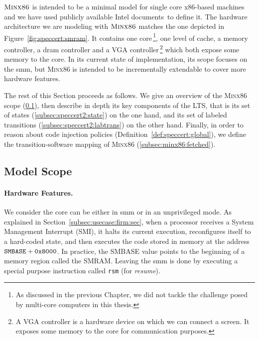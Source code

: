 $\textsc{Minx86}$ is intended to be a minimal model for single core x86-based
machines and we have used publicly available Intel
documents\,\cite{intel2013celeron,intel2009mch,intel2014manual} to define it.
%
The hardware architecture we are modeling with $\textsc{Minx86}$ matches the
one depicted in Figure~\ref{fig:speccert:smram}. It contains one
core\,\footnote{As discussed in the previous Chapter, we did not tackle the
  challenge posed by multi-core computers in this thesis.}, one level of cache, a
memory controller, a \ac{dram} controller and a VGA controller\,\footnote{A VGA
  controller is a hardware device on which we can connect a screen. It exposes
  some memory to the core for communication purposes.} which both expose some
memory to the core.
%
In its current state of implementation, its scope focuses on the \ac{smm}, but
{\scshape Minx86} is intended to be incrementally extendable to cover more
hardware features.

The rest of this Section proceeds as follows.
%
We give an overview of the {\scshape Minx86} scope (\ref{sec:speccert2:scope}),
then describe in depth its key components of the LTS, that is its set of states
(\ref{subsec:speccert2:state}) on the one hand, and its set of labeled
transitions (\ref{subsec:speccert2:labtrans}) on the other hand.
%
Finally, in order to reason about code injection policies
(Definition~\ref{def:speccert:global}), we define the transition-software
mapping of {\scshape Minx86} (\ref{subsec:minx86:fetched}).

\subsection{Model Scope}
\label{sec:speccert2:scope}

\paragraph{Hardware Features.}
%
We consider the core can be either in \ac{smm} or in an unprivileged mode.
%
As explained in Section~\ref{subsec:usecase:firm:sec}, when a processor receives
a System Management Interrupt (SMI), it halts its current execution,
reconfigures itself to a hard-coded state, and then executes the code stored in
memory at the address $\mathtt{SMBASE} + \mathtt{0x8000}$.
%
In practice, the SMBASE value points to the beginning of a memory region called
the SMRAM.
%
Leaving the \ac{smm} is done by executing a special purpose instruction called
\texttt{rsm} (for \emph{resume}).

